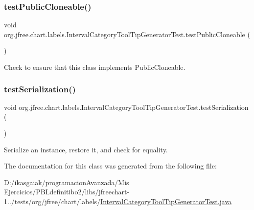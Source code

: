 \subsubsection{\texorpdfstring{test\+Public\+Cloneable()}{testPublicCloneable()}}
{\footnotesize\ttfamily void org.\+jfree.\+chart.\+labels.\+Interval\+Category\+Tool\+Tip\+Generator\+Test.\+test\+Public\+Cloneable (\begin{DoxyParamCaption}{ }\end{DoxyParamCaption})}

Check to ensure that this class implements Public\+Cloneable. \mbox{\label{classorg_1_1jfree_1_1chart_1_1labels_1_1_interval_category_tool_tip_generator_test_a9b6f2892021c0e6766ce2a5aa9af2351}} 
\subsubsection{\texorpdfstring{test\+Serialization()}{testSerialization()}}
{\footnotesize\ttfamily void org.\+jfree.\+chart.\+labels.\+Interval\+Category\+Tool\+Tip\+Generator\+Test.\+test\+Serialization (\begin{DoxyParamCaption}{ }\end{DoxyParamCaption})}

Serialize an instance, restore it, and check for equality. 

The documentation for this class was generated from the following file\+:\begin{DoxyCompactItemize}
\item 
D\+:/ikasgaiak/programacion\+Avanzada/\+Mis Ejercicios/\+P\+B\+Ldefinitibo2/libs/jfreechart-\/1../tests/org/jfree/chart/labels/\mbox{\hyperlink{_interval_category_tool_tip_generator_test_8java}{Interval\+Category\+Tool\+Tip\+Generator\+Test.\+java}}\end{DoxyCompactItemize}
